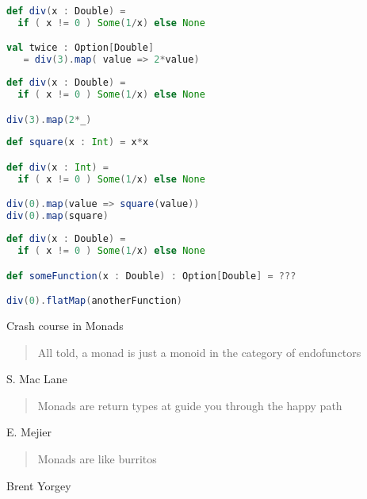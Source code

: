 \documentclass[10pt]{beamer}
\begin{document}
\begin{frame}[fragile]
\begin{lstlisting}[language=Scala, basicstyle=\ttfamily]
def div(x : Double) = 
  if ( x != 0 ) Some(1/x) else None

val twice : Option[Double] 
   = div(3).map( value => 2*value)
\end{lstlisting}
\end{frame}

\begin{frame}[fragile]
\begin{lstlisting}[language=Scala, basicstyle=\ttfamily]
def div(x : Double) = 
  if ( x != 0 ) Some(1/x) else None

div(3).map(2*_)
\end{lstlisting}
\end{frame}

\begin{frame}[fragile]
\begin{lstlisting}[language=Scala, basicstyle=\ttfamily]
def square(x : Int) = x*x 

def div(x : Int) = 
  if ( x != 0 ) Some(1/x) else None

div(0).map(value => square(value))
div(0).map(square)
\end{lstlisting}
\end{frame}

\begin{frame}[fragile]
\begin{lstlisting}[language=Scala, basicstyle=\ttfamily]
def div(x : Double) = 
  if ( x != 0 ) Some(1/x) else None

def someFunction(x : Double) : Option[Double] = ???

div(0).flatMap(anotherFunction)
\end{lstlisting}
\end{frame}

\begin{frame}
Crash course in Monads 
\end{frame}

\begin{frame}[fragile]
\begin{quotation}
All told, a monad is just a monoid in the category of endofunctors 
\end{quotation}
\begin{flushright}
S. Mac Lane
\end{flushright}
\begin{quotation}
Monads are return types at guide you through the happy path 
\end{quotation}
\begin{flushright}
E. Mejier 
\end{flushright}
\begin{quotation}
Monads are like burritos 
\end{quotation}
\begin{flushright}
Brent Yorgey
\end{flushright}
\end{frame}
\end{document}
